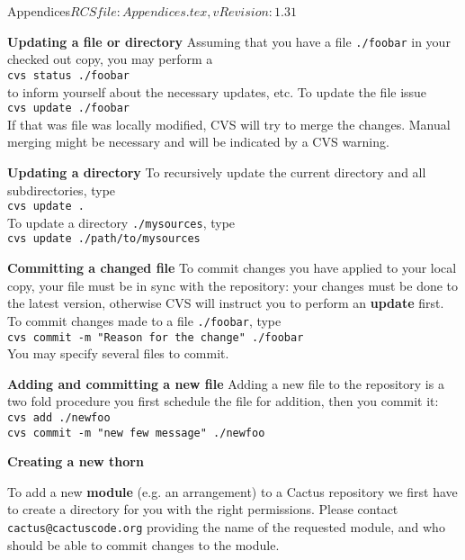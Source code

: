 \begin{cactuspart}{6}{Appendices}{$RCSfile: Appendices.tex,v $}{$Revision: 1.31 $}
\begin{description}
\item\textbf{Updating a file or directory}\newline
Assuming that you have a file {\tt ./foobar} in your checked out
copy, you may perform a \\
{\tt cvs status ./foobar}\\
to inform yourself about the necessary updates, etc. To update the
file issue \\
{\tt cvs update ./foobar}\\
If that was file was locally modified, CVS will try to merge the
changes. Manual merging might be necessary and will be indicated by a
CVS warning.

\item\textbf{Updating a directory}\newline
To recursively update the current directory and all subdirectories,
type\\
{\tt cvs update .}\\
To update a directory {\tt ./mysources}, type\\
{\tt cvs update ./path/to/mysources}

\item\textbf{Committing a changed file}\newline
To commit changes you have applied to your local copy, your file must be in
sync with the repository: your changes must be done to the
latest version, otherwise CVS will instruct you to perform an {\bf
update} first. To commit changes made to a file {\tt ./foobar}, type\\
{\tt cvs commit -m "Reason for the change" ./foobar}\\
You may specify several files to commit.

\item\textbf{Adding and committing a new file}\newline
Adding a new file to the repository is a two fold procedure you first
schedule the file for addition, then you commit it:\\
{\tt cvs add ./newfoo}\\
{\tt cvs commit -m "new few message" ./newfoo}

\item\textbf{Creating a new thorn}\newline

To add a new {\bf module} (e.g. an arrangement) to a Cactus repository we
first have to create a directory for you with the right permissions.
Please contact {\tt cactus@cactuscode.org} providing the name of the
requested module, and who should be able to commit changes to the module.


\end{description}
\end{cactuspart}
